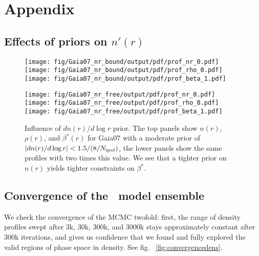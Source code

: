 \section{Appendix}
\appendix
\subsection{Effects of priors on $n'(r)$}
\begin{figure*}
  \begin{center}
    \hspace{-7mm}
    \texttt{[image: fig/Gaia07\_nr\_bound/output/pdf/prof\_nr\_0.pdf]}
    \texttt{[image: fig/Gaia07\_nr\_bound/output/pdf/prof\_rho\_0.pdf]}
    \texttt{[image: fig/Gaia07\_nr\_bound/output/pdf/prof\_beta\_1.pdf]}
  \end{center}
  \begin{center}
    \texttt{[image: fig/Gaia07\_nr\_free/output/pdf/prof\_nr\_0.pdf]}
    \texttt{[image: fig/Gaia07\_nr\_free/output/pdf/prof\_rho\_0.pdf]}
    \texttt{[image: fig/Gaia07\_nr\_free/output/pdf/prof\_beta\_1.pdf]}
  \end{center}
  \begin{center}
    \caption{Influence of $dn(r)/d\log r$ prior. The top panels show
      $n(r)$, $\rho(r)$, and $\beta^*(r)$ for Gaia07 with a moderate
      prior of $|dn(r)/d\log r|<1.5/(8/N_{\rm ipol})$, the lower
      panels show the same profiles with two times this value. We see
      that a tighter prior on $n(r)$ yields tighter constraints on $\beta^*$.}
    \label{fig:nrprime}
    \end{center}
\end{figure*}



\subsection{Convergence of the \MultiNest\ model ensemble}
We check the convergence of the MCMC twofold: first, the range of
density profiles swept after 3k, 30k, 300k, and 3000k stays
approximately constant after 300k iterations, and gives us confidence
that we found and fully explored the valid regions of phase space in
density. See fig. ~\ref{fig:convergencedens}.

